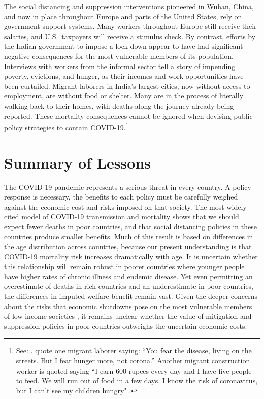 \documentclass[11pt]{article}
\begin{document}
The social distancing and suppression interventions pioneered in Wuhan, China, and now in place throughout Europe and parts of the United States, rely on government support systems. Many workers throughout Europe still receive their salaries, and U.S.\ taxpayers will receive a stimulus check. By contrast, efforts by the Indian government to impose a lock-down appear to have had significant negative consequences for the most vulnerable members of its population. Interviews with workers from the informal sector tell a story of impending poverty, evictions, and hunger, as their incomes and work opportunities have been curtailed. Migrant laborers in India's largest cities, now without access to employment, are without food or shelter. Many are in the process of literally walking back to their homes, with deaths along the journey already being reported. These mortality consequences cannot be ignored when devising public policy strategies to contain COVID-19.\footnote{
  See: \textcite{abihabib2020b,abihabib2020a,bbc2020,tewari2020}. \textcite{abihabib2020a} quote one migrant laborer saying: ``You fear the disease, living on the streets. But I fear hunger more, not corona.'' Another migrant construction worker is quoted saying ``I earn 600 rupees every day and I have five people to feed. We will run out of food in a few days. I know the risk of coronavirus, but I can't see my children hungry" \parencite{bbc2020}.}

\section{Summary of Lessons}

The COVID-19 pandemic represents a serious threat in every country. A policy response is necessary, the benefits to each policy must be carefully weighed against the economic cost and risks imposed on that society. The most widely-cited model of COVID-19 transmission and mortality shows that we should expect fewer deaths in poor countries, and that social distancing policies in these countries produce smaller benefits. Much of this result is based on differences in the age distribution across countries, because our present understanding is that COVID-19 mortality risk increases dramatically with age. It is uncertain whether this relationship will remain robust in poorer countries where younger people have higher rates of chronic illness and endemic disease. Yet even permitting an overestimate of deaths in rich countries and an underestimate in poor countries, the differences in imputed welfare benefit remain vast. Given the deeper concerns about the risks that economic shutdowns pose on the most vulnerable members of low-income societies \parencite{saleh2020}, it remains unclear whether the value of mitigation and suppression policies in poor countries outweighs the uncertain economic costs.
\end{document}
